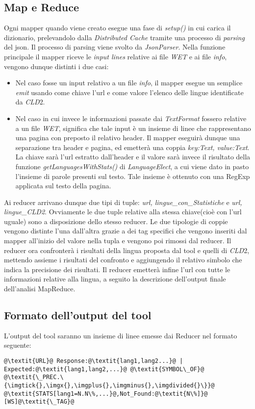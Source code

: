 \documentclass{article}
\newcommand{\MR}{MapReduce}
\newcommand{\cld}{\textit{CLD}2}
\newcommand{\WET}{\textit{WET}}
\newcommand{\info}{\textit{info}}
\newcommand{\DC}{\textit{Distributed Cache}}
\newcommand{\class}[1]{\textit{#1}}
\newcommand{\function}[1]{\textit{#1}}
\begin{document}
\subsection{Map e Reduce}
Ogni mapper quando viene creato esegue una fase di \function{setup()} in cui carica il dizionario, prelevandolo dalla \DC{} tramite una processo di \textit{parsing} del json. Il processo di parsing viene svolto da \function{JsonParser}. Nella funzione principale il mapper riceve le \textit{input lines} relative ai file \WET{} e ai file \info{}, vengono dunque distinti i due casi:
\begin{itemize}
    \item Nel caso fosse un input relativo a un file \info{}, il mapper esegue un semplice \textit{emit} usando come chiave l'url e come valore l'elenco delle lingue identificate da \cld{}.
    \item Nel caso in cui invece le informazioni passate dai \textit{TextFormat} fossero relative a un file \WET{}, significa che tale input è un insieme di linee che rappresentano una pagina con preposto il relativo header. Il mapper eseguirà dunque una separazione tra header e pagina, ed emetterà una coppia \textit{\textlangle key:Text, value:Text\textrangle}. La chiave sarà l'url estratto dall'header e il valore sarà invece il risultato della funzione \function{getLanguagesWithStats()} di \class{LanguageElect}, a cui viene dato in pasto l'insieme di parole presenti sul testo. Tale insieme è ottenuto con una RegExp applicata sul testo della pagina.
\end{itemize}

Ai reducer arrivano dunque due tipi di tuple: \textit{\textlangle url, lingue\_con\_Statistiche\textrangle} e \textit{\textlangle url, lingue\_\cld\textrangle}. Ovviamente le due tuple relative alla stessa chiave(cioè con l'url uguale) sono a disposizione dello stesso reducer. Le due tipologie di coppie vengono distinte l'una dall'altra grazie a dei tag specifici che vengono inseriti dal mapper all'inizio del valore nella tupla e vengono poi rimossi dal reducer. Il reducer ora confronterà i risultati della lingua proposta dal tool e quelli di \cld{}, mettendo assieme i risultati del confronto e aggiungendo il relativo simbolo che indica la precisione dei risultati. Il reducer emetterà infine l'url con tutte le informazioni relative alla lingua, a seguito la descrizione dell'output finale dell'analisi \MR{}. 

\subsection{Formato dell'output del tool}
L'output del tool saranno un insieme di linee emesse dai Reducer nel formato seguente:
\begin{verbatim}
@\textit{URL}@ Response:@\textit{lang1,lang2...}@ | Expected:@\textit{lang1,lang2,...}@ @\textit{SYMBOL\_OF}@
@\textit{\_PREC.\{\imgtick{},\imgx{},\imgplus{},\imgminus{},\imgdivided{}\}}@ @\textit{STATS[lang1=N.N\%,...}@,Not_Found:@\textit{N\%]}@ [WS]@\textit{\_TAG}@
\end{verbatim}
\end{document}
